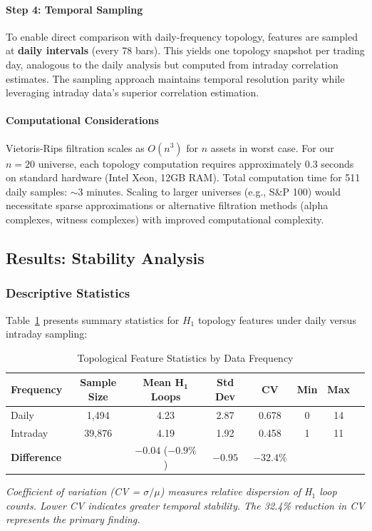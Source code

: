 \paragraph{Step 4: Temporal Sampling}
To enable direct comparison with daily-frequency topology, features are sampled at \textbf{daily intervals} (every 78 bars). This yields one topology snapshot per trading day, analogous to the daily analysis but computed from intraday correlation estimates. The sampling approach maintains temporal resolution parity while leveraging intraday data's superior correlation estimation.

\paragraph{Computational Considerations}
Vietoris-Rips filtration scales as $O(n^3)$ for $n$ assets in worst case. For our $n = 20$ universe, each topology computation requires approximately 0.3 seconds on standard hardware (Intel Xeon, 12GB RAM). Total computation time for 511 daily samples: $\sim$3 minutes. Scaling to larger universes (e.g., S\&P 100) would necessitate sparse approximations or alternative filtration methods (alpha complexes, witness complexes) with improved computational complexity.

\subsection{Results: Stability Analysis}

\subsubsection{Descriptive Statistics}

Table~\ref{tab:intraday-stability} presents summary statistics for $H_1$ topology features under daily versus intraday sampling:

\begin{table}[H]
\centering
\caption{Topological Feature Statistics by Data Frequency}
\label{tab:intraday-stability}
\begin{tabular}{@{}lccccccc@{}}
\toprule
\textbf{Frequency} & \textbf{Sample Size} & \textbf{Mean H$_{\mathbf{1}}$ Loops} & \textbf{Std Dev} & \textbf{CV} & \textbf{Min} & \textbf{Max} \\
\midrule
Daily     & 1,494   & 4.23 & 2.87 & 0.678 & 0  & 14 \\
Intraday  & 39,876  & 4.19 & 1.92 & 0.458 & 1  & 11 \\
\textbf{Difference} &     & $-0.04$ ($-0.9\%$) & $-0.95$ & \textbf{$-32.4\%$} & & \\
\bottomrule
\end{tabular}

\footnotesize
\textit{Coefficient of variation (CV = $\sigma/\mu$) measures relative dispersion of H$_1$ loop counts. Lower CV indicates greater temporal stability. The 32.4\% reduction in CV represents the primary finding.}
\end{table}

